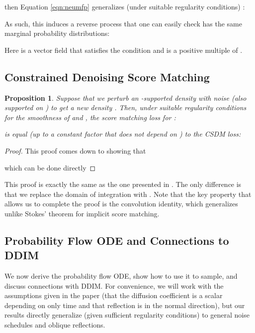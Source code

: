 \documentclass{article}
\theoremstyle{plain}
\newtheorem{proposition}[theorem]{Proposition}
\theoremstyle{definition}
\theoremstyle{remark}
\begin{document}
then Equation \ref{eqn:neumfp} generalizes (under suitable regularity conditions) \citep{Schuss2013BrownianDA}:

As such, this induces a reverse process \citep{Williams1988OnTO, Cattiaux1988TimeRO} that one can easily check has the same marginal probability distributions:

Here  is a vector field that satisfies the condition  and  is a positive multiple of .

\subsection{Constrained Denoising Score Matching}\label{sec:app:theory:cdsm}

\begin{proposition}\label{prop:app:cdsm}
    Suppose that we perturb an -supported density  with noise  (also supported on ) to get a new density . Then, under suitable regularity conditions for the smoothness of  and , the score matching loss for :
    
    is equal (up to a constant factor that does not depend on ) to the CSDM loss:
    
\end{proposition}

\begin{proof}
    This proof comes down to showing that

    

    which can be done directly

    
\end{proof}

This proof is exactly the same as the one presented in \citep{Vincent2011ACB}. The only difference is that we replace the domain of integration with . Note that the key property that allows us to complete the proof is the convolution identity, which generalizes unlike Stokes' theorem for implicit score matching.

\subsection{Probability Flow ODE and Connections to DDIM}\label{sec:app:theory:ode}

We now derive the probability flow ODE, show how to use it to sample, and discuss connections with DDIM. For convenience, we will work with the assumptions given in the paper (that the diffusion coefficient is a scalar depending on only time and that reflection is in the normal direction), but our results directly generalize (given sufficient regularity conditions) to general noise schedules and oblique reflections.
\end{document}
